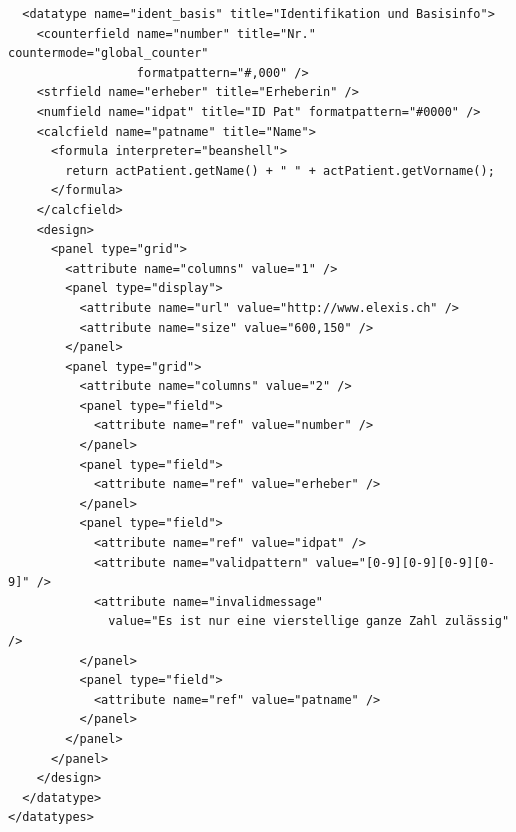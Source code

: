 \documentclass[a4paper]{scrartcl}
\begin{document}
\begin{lstlisting}
  <datatype name="ident_basis" title="Identifikation und Basisinfo">
    <counterfield name="number" title="Nr." countermode="global_counter"
                  formatpattern="#,000" />
    <strfield name="erheber" title="Erheberin" />
    <numfield name="idpat" title="ID Pat" formatpattern="#0000" />
    <calcfield name="patname" title="Name">
      <formula interpreter="beanshell">
        return actPatient.getName() + " " + actPatient.getVorname();
      </formula>
    </calcfield>
    <design>
      <panel type="grid">
        <attribute name="columns" value="1" />
        <panel type="display">
          <attribute name="url" value="http://www.elexis.ch" />
          <attribute name="size" value="600,150" />
        </panel>
        <panel type="grid">
          <attribute name="columns" value="2" />
          <panel type="field">
            <attribute name="ref" value="number" />
          </panel>
          <panel type="field">
            <attribute name="ref" value="erheber" />
          </panel>
          <panel type="field">
            <attribute name="ref" value="idpat" />
            <attribute name="validpattern" value="[0-9][0-9][0-9][0-9]" />
            <attribute name="invalidmessage" 
              value="Es ist nur eine vierstellige ganze Zahl zulässig" />
          </panel>
          <panel type="field">
            <attribute name="ref" value="patname" />
          </panel>
        </panel>
      </panel>
    </design>
  </datatype>
</datatypes>
\end{lstlisting}
\end{document}
